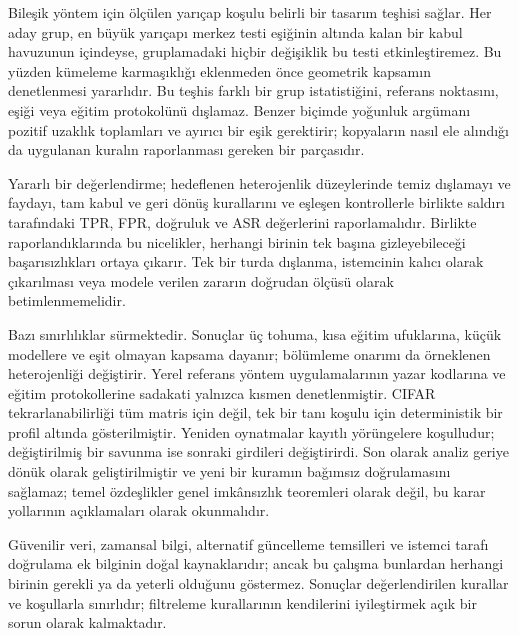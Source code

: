 \documentclass[journal]{IEEEtran}
\begin{document}
Bileşik yöntem için ölçülen yarıçap koşulu belirli bir tasarım teşhisi sağlar. Her aday grup, en büyük yarıçapı merkez testi eşiğinin altında kalan bir kabul havuzunun içindeyse, gruplamadaki hiçbir değişiklik bu testi etkinleştiremez. Bu yüzden kümeleme karmaşıklığı eklenmeden önce geometrik kapsamın denetlenmesi yararlıdır. Bu teşhis farklı bir grup istatistiğini, referans noktasını, eşiği veya eğitim protokolünü dışlamaz. Benzer biçimde yoğunluk argümanı pozitif uzaklık toplamları ve ayırıcı bir eşik gerektirir; kopyaların nasıl ele alındığı da uygulanan kuralın raporlanması gereken bir parçasıdır.

Yararlı bir değerlendirme; hedeflenen heterojenlik düzeylerinde temiz dışlamayı ve faydayı, tam kabul ve geri dönüş kurallarını ve eşleşen kontrollerle birlikte saldırı tarafındaki TPR, FPR, doğruluk ve ASR değerlerini raporlamalıdır. Birlikte raporlandıklarında bu nicelikler, herhangi birinin tek başına gizleyebileceği başarısızlıkları ortaya çıkarır. Tek bir turda dışlanma, istemcinin kalıcı olarak çıkarılması veya modele verilen zararın doğrudan ölçüsü olarak betimlenmemelidir.

Bazı sınırlılıklar sürmektedir. Sonuçlar üç tohuma, kısa eğitim ufuklarına, küçük modellere ve eşit olmayan kapsama dayanır; bölümleme onarımı da örneklenen heterojenliği değiştirir. Yerel referans yöntem uygulamalarının yazar kodlarına ve eğitim protokollerine sadakati yalnızca kısmen denetlenmiştir. CIFAR tekrarlanabilirliği tüm matris için değil, tek bir tanı koşulu için deterministik bir profil altında gösterilmiştir. Yeniden oynatmalar kayıtlı yörüngelere koşulludur; değiştirilmiş bir savunma ise sonraki girdileri değiştirirdi. Son olarak analiz geriye dönük olarak geliştirilmiştir ve yeni bir kuramın bağımsız doğrulamasını sağlamaz; temel özdeşlikler genel imkânsızlık teoremleri olarak değil, bu karar yollarının açıklamaları olarak okunmalıdır.

Güvenilir veri, zamansal bilgi, alternatif güncelleme temsilleri ve istemci tarafı doğrulama ek bilginin doğal kaynaklarıdır; ancak bu çalışma bunlardan herhangi birinin gerekli ya da yeterli olduğunu göstermez. Sonuçlar değerlendirilen kurallar ve koşullarla sınırlıdır; filtreleme kurallarının kendilerini iyileştirmek açık bir sorun olarak kalmaktadır.
\end{document}
